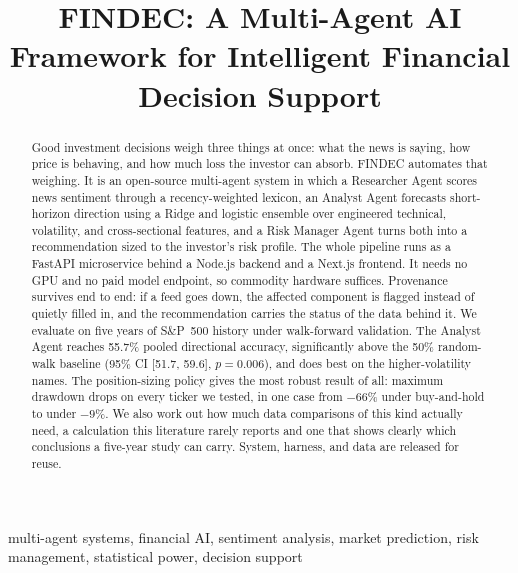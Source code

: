 \documentclass[conference]{IEEEtran}
\begin{document}
\title{FINDEC: A Multi-Agent AI Framework for Intelligent Financial Decision Support}

\author{
}

\maketitle

\begin{abstract}
Good investment decisions weigh three things at once: what the news is saying, how price is behaving, and how much loss the investor can absorb. FINDEC automates that weighing. It is an open-source multi-agent system in which a Researcher Agent scores news sentiment through a recency-weighted lexicon, an Analyst Agent forecasts short-horizon direction using a Ridge and logistic ensemble over engineered technical, volatility, and cross-sectional features, and a Risk Manager Agent turns both into a recommendation sized to the investor's risk profile. The whole pipeline runs as a FastAPI microservice behind a Node.js backend and a Next.js frontend. It needs no GPU and no paid model endpoint, so commodity hardware suffices. Provenance survives end to end: if a feed goes down, the affected component is flagged instead of quietly filled in, and the recommendation carries the status of the data behind it. We evaluate on five years of S\&P~500 history under walk-forward validation. The Analyst Agent reaches 55.7\% pooled directional accuracy, significantly above the 50\% random-walk baseline (95\% CI [51.7, 59.6], $p=0.006$), and does best on the higher-volatility names. The position-sizing policy gives the most robust result of all: maximum drawdown drops on every ticker we tested, in one case from $-66\%$ under buy-and-hold to under $-9\%$. We also work out how much data comparisons of this kind actually need, a calculation this literature rarely reports and one that shows clearly which conclusions a five-year study can carry. System, harness, and data are released for reuse.
\end{abstract}

\begin{IEEEkeywords}
multi-agent systems, financial AI, sentiment analysis, market prediction, risk management, statistical power, decision support
\end{IEEEkeywords}
\end{document}
